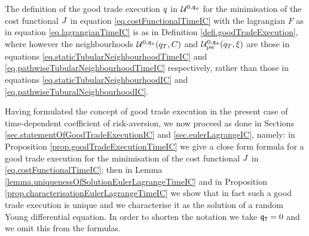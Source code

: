 \documentclass[10pt,a4paper]{article}
\begin{document}
	The definition of the good trade execution $q$ in $\mathcal{U}^{0,\mathfrak{q_0}}$ for the minimisation of the cost functional $J$ in equation \eqref{eq.costFunctionalTimeIC} with the lagrangian $F$ as in equation \eqref{eq.lagrangianTimeIC} is as in Definition \ref{defi.goodTradeExecution}, where however the neighbourhoods $\mathcal{U}^{0,\mathfrak{q_0}} (q_T, C)$ and $\mathcal{U}^{0,\mathfrak{q_0}}_{\text{pw}}(q_T,\xi)$ are those in equations \eqref{eq.staticTubularNeighbourhoodTimeIC} and \eqref{eq.pathwiseTubularNeighbourhoodTimeIC} respectively, rather than those in equations \eqref{eq.staticTubularNeighbourhoodIC} and \eqref{eq.pathwiseTuburalNeighbourhoodIC}.
	
	Having formulated the concept of good trade execution in the present case of time-dependent coefficient of risk-aversion, we now proceed as done in Sections \ref{sec.statementOfGoodTradeExecutionIC} and \ref{sec.eulerLagrangeIC}, namely: in Proposition \ref{prop.goodTradeExecutionTimeIC} we give a close form formula for a good trade execution for the minimisation of the cost functional $J$ in \eqref{eq.costFunctionalTimeIC}; then in Lemma \ref{lemma.uniquenessOfSolutionEulerLagrangeTimeIC} and in Proposition \ref{prop.characterisationEulerLagrangeTimeIC} we show that in fact such a good trade execution is unique and we characterise it as the solution of a random Young differential equation. In order to shorten the notation we take $\mathfrak{q}_{\mathtt{T} } = 0$ and we omit this from the formulas. 
	
\end{document}
